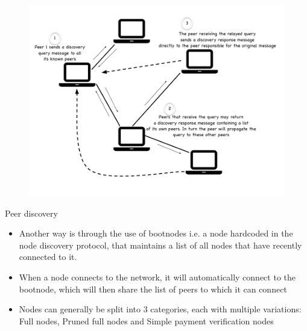\documentclass[10pt]{beamer}
\begin{document}

\begin{frame}
	\begin{figure}[]
		\centering
		\includegraphics  [scale=0.3]{Images/p2pdisc}
	\end{figure}
\end{frame}


\begin{frame}{Peer discovery}
	\begin{itemize}
		\item Another way is through the use of bootnodes i.e. a node hardcoded in the node discovery protocol, that maintains a list of all nodes that have recently connected to it.
		\item When a node connects to the network, it will automatically connect to the bootnode, which will then share the list of peers to which it can connect
		\item Nodes can generally be split into 3 categories, each with multiple variations: Full nodes, Pruned full nodes and Simple payment verification nodes
	\end{itemize}
\end{frame}

\end{document}
